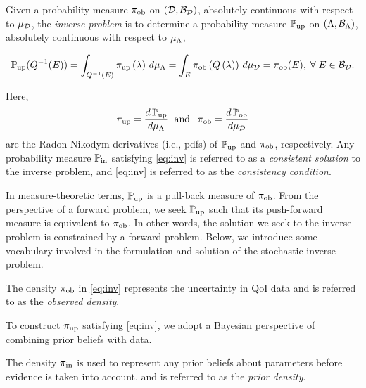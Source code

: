 \begin{defn}\label{defn:consistency}
Given a probability measure $\operatorname*{\pi_{ob}}$ on $(\mathcal{D}, \mathcal{B}_{\mathcal{D}})$, absolutely continuous with respect to $\mu_{\mathcal{D}}$, the \emph{inverse problem} is to determine a probability measure $\operatorname*{\mathbb{P}_{up}}$ on $({\Lambda}, \mathcal{B}_{{\Lambda}})$, absolutely continuous with respect to $\mu_{{\Lambda}}$, 

\begin{equation}\label{eq:inv}
\operatorname*{\mathbb{P}_{up}}(Q^{-1}(E)) = \int_{Q^{-1}(E)} \operatorname*{\pi_{up}} \left ( \lambda \right ) \, d\mu_{{\Lambda}} = \int_E \operatorname*{\pi_{ob}} \left ( Q\left ( \lambda \right ) \right ) \, d\mu_{\mathcal{D}} = \operatorname*{\pi_{ob}}(E), \; \forall \; E \in \mathcal{B}_{\mathcal{D}}.
\end{equation} 

Here, 
\begin{equation*}
\operatorname*{\pi_{up}} = \frac{d\operatorname*{\mathbb{P}_{up}}}{d\mu_{{\Lambda}}} \;\text{ and }\; \operatorname*{\pi_{ob}} = \frac{d\operatorname*{\mathbb{P}_{ob}}}{d\mu_{\mathcal{D}}}
\end{equation*}
are the Radon-Nikodym derivatives (i.e., pdfs) of $\operatorname*{\mathbb{P}_{up}}$ and $\operatorname*{\pi_{ob}}$, respectively. 
Any probability measure $\operatorname*{\mathbb{P}_{in}}$ satisfying \eqref{eq:inv} is referred to as a \emph{consistent solution} to the inverse problem, and \eqref{eq:inv} is referred to as the \emph{consistency condition}.
\end{defn}

In measure-theoretic terms, $\operatorname*{\mathbb{P}_{up}}$ is a pull-back measure of $\operatorname*{\pi_{ob}}$.
From the perspective of a forward problem, we seek $\operatorname*{\mathbb{P}_{up}}$ such that its push-forward measure is equivalent to $\operatorname*{\pi_{ob}}$. 
In other words, the solution we seek to the inverse problem is constrained by a forward problem. 
Below, we introduce some vocabulary involved in the formulation and solution of the stochastic inverse problem.

\begin{defn}\label{defn:obsden}
The density $\operatorname*{\pi_{ob}}$ in \eqref{eq:inv} represents the uncertainty in QoI data and is referred to as the \emph{observed density}.
\end{defn}

To construct $\operatorname*{\pi_{up}}$ satisfying \eqref{eq:inv}, we adopt a Bayesian perspective of combining prior beliefs with data. 

\begin{defn}\label{defn:initial}
The density $\operatorname*{\pi_{in}}$ is used to represent any prior beliefs about parameters before evidence is taken into account, and is referred to as the \emph{prior density}.
\end{defn}

